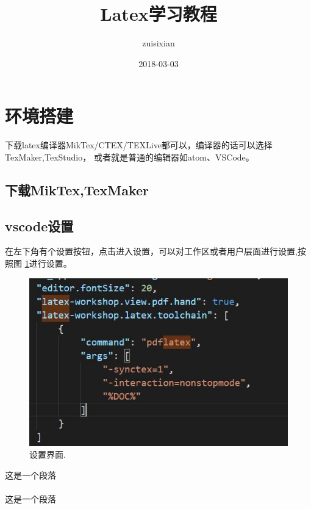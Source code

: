\documentclass{article}
\title{Latex学习教程}
\date{2018-03-03}
\author{zuisixian}
\begin{document}
\maketitle
\newpage


  \section{环境搭建}
  下载latex编译器MikTex/CTEX/TEXLive都可以，编译器的话可以选择TexMaker,TexStudio，
  或者就是普通的编辑器如atom、VSCode。
    \subsection{下载MikTex,TexMaker}

    \subsection{vscode设置}
    在左下角有个设置按钮，点击进入设置，可以对工作区或者用户层面进行设置,按照图 \ref{fig:set1}进行设置。
    \begin{figure}
      \includegraphics[width=\linewidth]{image/vscode-setting.jpg}
      \caption{设置界面.}
      \label{fig:set1}
    \end{figure}

    这是一个段落

    \paragraph{}
      这是一个段落
\end{document}
